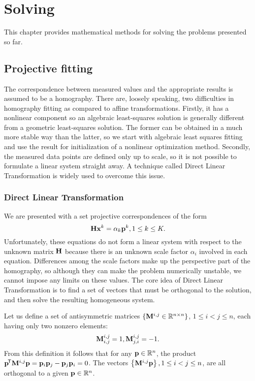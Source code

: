 \chapter{Solving}

This chapter provides mathematical methods for solving the problems presented so far.

\section{Projective fitting}

The correspondence between measured values and the appropriate results is assumed to be a homography.
There are, loosely speaking, two difficulties in homography fitting as compared to affine transformations.
Firstly, it has a nonlinear component so an algebraic least-squares solution is generally different from a geometric least-squares solution.
The former can be obtained in a much more stable way than the latter, so we start with algebraic least squares fitting and use the result for initialization of a nonlinear optimization method.
Secondly, the measured data points are defined only up to scale, so it is not possible to formulate a linear system straight away.
A technique called Direct Linear Transformation is widely used to overcome this issue.

\subsection{Direct Linear Transformation}

We are presented with a set projective correspondences of the form
$$\mathbf{H} \mathbf{x}^k = \alpha_k \mathbf{p}^k, 1 \leq k \leq K.$$
Unfortunately, these equations do not form a linear system with respect to the unknown matrix $\mathbf{H}$ because there is an unknown scale factor $\alpha_i$ involved in each equation.
Differences among the scale factors make up the perspective part of the homography, so although they can make the problem numerically unstable, we cannot impose any limits on these values.
The core idea of Direct Linear Transformation is to find a set of vectors that must be orthogonal to the solution, and then solve the resulting homogeneous system.

Let us define a set of antisymmetric matrices $\{\mathbf{M}^{i, j} \in \mathbb{R}^{n \times n}\}$, $1 \leq i < j \leq n$, each having only two nonzero elements:
$$\mathbf{M}^{i, j}_{i, j} = 1,
\mathbf{M}^{i, j}_{j, i} = -1.$$
From this definition it follows that for any $\mathbf{p} \in \mathbb{R}^n$, the product $\mathbf{p}^{\!\mathsf{T}} \mathbf{M}^{i, j} \mathbf{p} = \mathbf{p}_{i} \mathbf{p}_{j} - \mathbf{p}_{j} \mathbf{p}_{i} = 0$.
The vectors $\left\{ \mathbf{M}^{i, j} \mathbf{p} \right\}, 1 \leq i < j \leq n$, are all orthogonal to a given $\mathbf{p} \in \mathbb{R}^n$.

